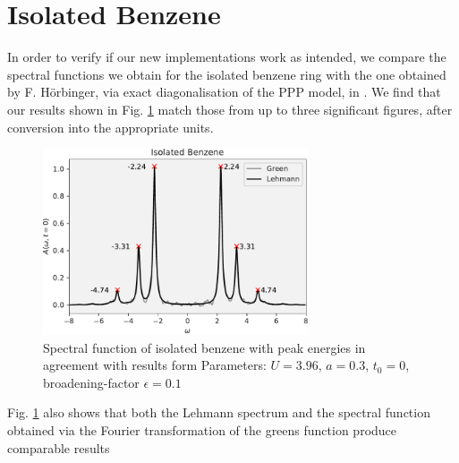 \section{Isolated Benzene}
\color{blue} 
    In order to verify if our new implementations work as intended, we compare the spectral functions we obtain for the isolated benzene ring with the one obtained by F. Hörbinger, via exact diagonalisation of the PPP model, in \cite{hoerbinger}. We find that our results shown in Fig. \ref{fig:isolated_benzene} match those from \cite{hoerbinger} up to three significant figures, after conversion into the appropriate units.
\color{black}

\medskip
\begin{figure}[!hbt]
    \centering
    \includegraphics[width=0.7\textwidth]{graph/isolated_benzene.pdf}
    \caption{Spectral function of isolated benzene with peak energies in agreement with results form \cite{hoerbinger}\newline
    Parameters: $U = 3.96$, $a = 0.3$, $t_0 = 0$, broadening-factor $\epsilon = 0.1 $
    }\label{fig:isolated_benzene}
\end{figure}

\color{blue}
Fig. \ref{fig:isolated_benzene} also shows that both the Lehmann spectrum and the spectral function obtained via the Fourier transformation of the greens function produce comparable results
\color{black}
